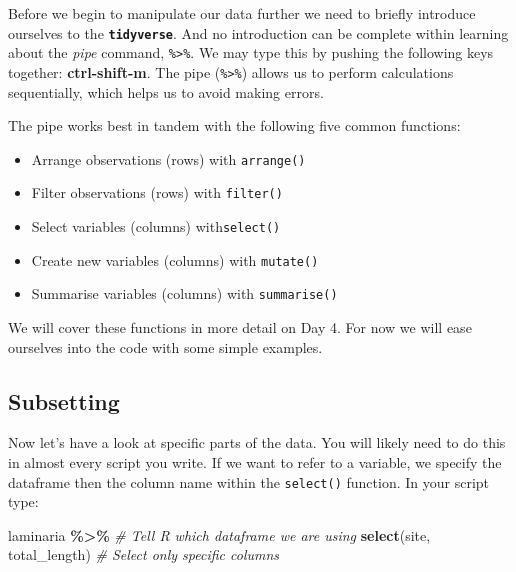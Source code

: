 \documentclass[
]{book}
\newenvironment{Shaded}{\begin{snugshade}}{\end{snugshade}}
\newcommand{\CommentTok}[1]{\textcolor[rgb]{0.56,0.35,0.01}{\textit{#1}}}
\newcommand{\KeywordTok}[1]{\textcolor[rgb]{0.13,0.29,0.53}{\textbf{#1}}}
\newcommand{\NormalTok}[1]{#1}
\newcommand{\OperatorTok}[1]{\textcolor[rgb]{0.81,0.36,0.00}{\textbf{#1}}}
\newcommand{\StringTok}[1]{\textcolor[rgb]{0.31,0.60,0.02}{#1}}
\providecommand{\tightlist}{%
  \setlength{\itemsep}{0pt}\setlength{\parskip}{0pt}}
\begin{document}
Before we begin to manipulate our data further we need to briefly introduce ourselves to the \textbf{\texttt{tidyverse}}. And no introduction can be complete within learning about the \emph{pipe} command, \texttt{\%\textgreater{}\%}. We may type this by pushing the following keys together: \textbf{ctrl-shift-m}. The pipe (\texttt{\%\textgreater{}\%}) allows us to perform calculations sequentially, which helps us to avoid making errors.

The pipe works best in tandem with the following five common functions:

\begin{itemize}
\tightlist
\item
  Arrange observations (rows) with \texttt{arrange()}\\
\item
  Filter observations (rows) with \texttt{filter()}\\
\item
  Select variables (columns) with\texttt{select()}\\
\item
  Create new variables (columns) with \texttt{mutate()}\\
\item
  Summarise variables (columns) with \texttt{summarise()}
\end{itemize}

We will cover these functions in more detail on Day 4. For now we will ease ourselves into the code with some simple examples.

\hypertarget{subsetting}{%
\subsection{Subsetting}\label{subsetting}}

Now let's have a look at specific parts of the data. You will likely need to do this in almost every script you write. If we want to refer to a variable, we specify the dataframe then the column name within the \texttt{select()} function. In your script type:

\begin{Shaded}
\begin{Highlighting}[]
\NormalTok{laminaria }\OperatorTok{\%>\%}\StringTok{ }\CommentTok{\# Tell R which dataframe we are using}
\StringTok{  }\KeywordTok{select}\NormalTok{(site, total\_length) }\CommentTok{\# Select only specific columns}
\end{Highlighting}
\end{Shaded}
\end{document}
